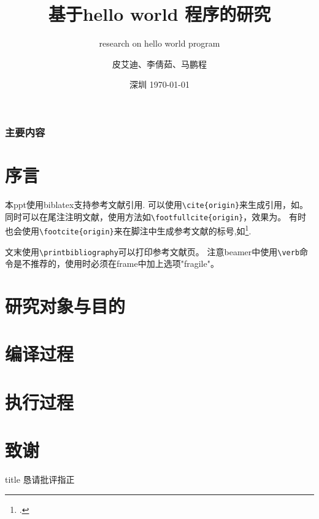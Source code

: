 \documentclass[]{SYSUslide1}
\title[中山大学]{基于hello world 程序的研究}
\subtitle{research on hello world program}
\author[皮艾迪]{皮艾迪、李倩茹、马鹏程}
\institute[航空航天学院]{
  中山大学

  航空航天学院
}
\date[深圳 \today]{深圳 \today}
\begin{document}
\frame{\titlepage}

\begin{frame}
\frametitle{主要内容}
\tableofcontents
\end{frame}

\section{序言}

\begin{frame}[fragile]
    本ppt使用biblatex支持参考文献引用.
    可以使用\verb|\cite{origin}|来生成引用，如\cite{origin}。
    同时可以在尾注注明文献，使用方法如\verb|\footfullcite{origin}|，效果为。
    有时也会使用\verb|\footcite{origin}|来在脚注中生成参考文献的标号,如\footcite{origin}.

    文末使用\verb|\printbibliography|可以打印参考文献页。
    注意beamer中使用\verb|\verb|命令是不推荐的，使用时必须在frame中加上选项"fragile"。
\end{frame}

\section{研究对象与目的}


\section{编译过程}

\section{执行过程}

\begin{frame}[allowframebreaks]
    \printbibliography[]
\end{frame}

\section*{致谢}  
\begin{frame}
\vfill
\centering
\begin{beamercolorbox}[sep=8pt,center,shadow=true,rounded=true]{title}
  \Huge{恳请批评指正}
\end{beamercolorbox}
\vfill
\end{frame}
\end{document}
